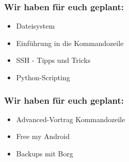 \begin{frame}
\frametitle{Wir haben für euch geplant:}
	\begin{itemize}
		\item Dateisystem
		\item Einführung in die Kommandozeile
		\item SSH - Tipps und Tricks
		\item Python-Scripting
	\end{itemize}
\end{frame}

\begin{frame}
\frametitle{Wir haben für euch geplant:}
\begin{itemize}
	\item Advanced-Vortrag Kommandozeile
	\item Free my Android
	\item Backups mit Borg
\end{itemize}
\end{frame}

